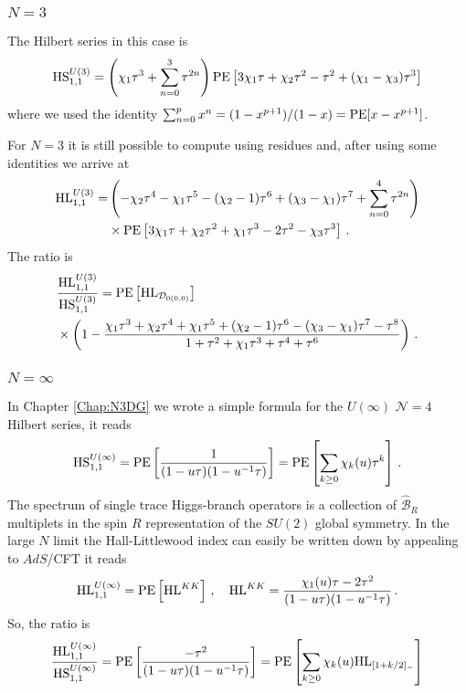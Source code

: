 \documentclass[main.tex]{subfiles}
\begin{document}
\subsubsection{$N=3$}
The Hilbert series in this case is
\begin{equation}
\textrm{HS}^{U(3)}_{1,1}=\left(\chi_1\tau^3+\sum_{n=0}^{3}\tau^{2n}\right)\operatorname{\mathrm{PE}}\left[3\chi_1\tau+\chi_2\tau^2-\tau^2+(\chi_1-\chi_3)\tau^3\right]
\end{equation}
where we used the identity $\sum_{n=0}^px^n=(1-x^{p+1})/(1-x)=\operatorname{\mathrm{PE}}[x-x^{p+1}]$.

For $N=3$ it is still possible to compute using residues and, after using some identities we arrive at
\begin{equation}
\begin{aligned}
\textrm{HL}^{U(3)}_{1,1}=&\left(-\chi_2\tau^4-\chi_1\tau^5-(\chi_2-1)\tau^6+(\chi_3-\chi_1)\tau^7+\sum_{n=0}^4\tau^{2n}\right)\\
&\times \operatorname{\mathrm{PE}}\left[3\chi_1\tau+\chi_2\tau^2+\chi_1\tau^3-2\tau^2-\chi_3\tau^3\right]\,.
\end{aligned}
\end{equation}
The ratio is
\begin{equation}
\begin{aligned}
&\frac{\textrm{HL}^{U(3)}_{1,1}}{\textrm{HS}^{U(3)}_{1,1}}=\operatorname{\mathrm{PE}}\left[\textrm{HL}_{\mathcal{D}_{0(0,0)}}\right]\\
&\times\left(1-\frac{\chi_1\tau^3+\chi_2\tau^4+\chi_1\tau^5+(\chi_2-1)\tau^6-(\chi_3-\chi_1)\tau^7-\tau^8}{1+\tau^2+\chi_1\tau^3+\tau^4+\tau^6}\right)\,.
\end{aligned}
\end{equation}

\subsubsection{$N=\infty$}
In Chapter \ref{Chap:N3DG} we wrote a simple formula for the $U(\infty)$ $\mathcal{N}=4$ Hilbert series, it reads
\begin{equation}
\textrm{HS}^{U(\infty)}_{1,1}=\operatorname{\mathrm{PE}}\left[\frac{1}{(1-u\tau)(1-u^{-1}\tau)}\right]=\operatorname{\mathrm{PE}}\left[\sum_{k\geq0}\chi_{k}(u)\tau^{k}\right]\,.
\end{equation}
The spectrum of single trace Higgs-branch operators is a collection of $\hat{\mathcal{B}}_{R}$ multiplets in the spin $R$ representation of the $SU(2)$ global symmetry.
In the large $N$ limit the Hall-Littlewood index can easily be written down by appealing to $AdS$/CFT \cite{Kinney:2005ej} it reads
\begin{equation}
\textrm{HL}^{U(\infty)}_{1,1}=\operatorname{\mathrm{PE}}\left[\textrm{HL}^{KK}\right]\,,\quad \textrm{HL}^{KK}=\frac{\chi_1(u)\tau-2\tau^2}{(1-u\tau)(1-u^{-1}\tau)}\,.
\end{equation}
So, the ratio is
\begin{equation}
\frac{\textrm{HL}^{U(\infty)}_{1,1}}{\textrm{HS}^{U(\infty)}_{1,1}}=\operatorname{\mathrm{PE}}\left[\frac{-\tau^2}{(1-u\tau)(1-u^{-1}\tau)}\right]=\operatorname{\mathrm{PE}}\left[\sum_{k\geq0}\chi_{k}(u)\textrm{HL}_{[1+k/2]_-}\right]
\end{equation}
\end{document}
